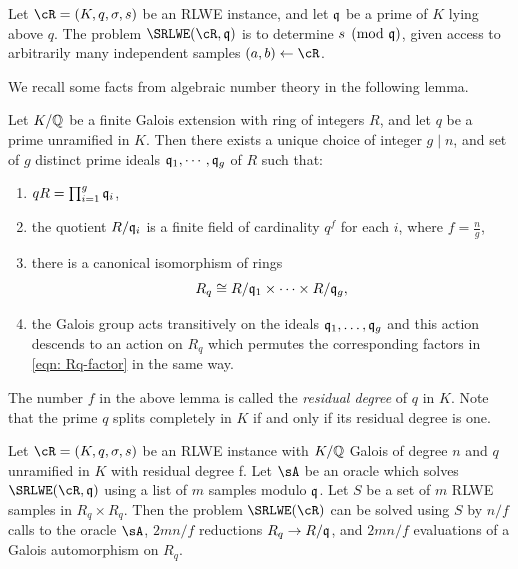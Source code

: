 \documentclass{amsart}
\begin{document}

\begin{Definition} \label{def: srlwe mod q}
        Let $\cR = (K,q,\sigma, s)$ be an RLWE instance, and let $\mathfrak{q}$ be a prime of $K$ lying above $q$.  The problem $\SRLWE(\cR, \fq)$ is to determine $s \pmod {\mathfrak{q}}$, given access to arbitrarily many independent samples $(a,b) \gets \cR$.
\end{Definition}

We recall some facts from algebraic number theory in the following lemma.
\begin{Lemma}
\label{lem: prime factorization}
Let $K/\mathbb{Q}$ be a finite Galois extension with ring of integers $R$,  and let $q$ be a prime unramified in $K$. Then there exists a unique choice of integer $g \mid n$, and set of $g$ distinct prime ideals $\mathfrak{q}_1, \cdots ,\mathfrak{q}_g$ of
$R$ such that:
\begin{enumerate}
        \item $qR = \prod_{i=1}^g \mathfrak{q}_i$,
        \item the quotient $R/\mathfrak{q}_{i}$ is a finite field of cardinality $q^f$  for each $i$, where $f = \frac{n}{g}$, 
        \item there is a canonical isomorphism of rings
                \begin{equation}
                        \label{eqn: Rq-factor}
    R_q \cong R/\mathfrak{q}_{1} \times \cdots \times R/\mathfrak{q}_{g},
    \end{equation}
\item the Galois group acts transitively on the ideals $\mathfrak{q}_1, \ldots, \mathfrak{q}_g$ and this action descends to an action on $R_q$ which permutes the corresponding factors in \eqref{eqn: Rq-factor} in the same way.
\end{enumerate}
\end{Lemma}
The number $f$ in the above lemma is called the {\it residual degree} of $q$ in $K$. Note that the prime $q$ splits completely in $K$ if and only if its residual degree is one.


\begin{theorem} \label{thm: reduction}
        Let $\cR = (K,q,\sigma, s)$ be an RLWE instance with $K/\mathbb{Q}$ Galois of degree $n$ and $q$ unramified in $K$ with residual degree f. Let $\sA$ be an oracle which solves $\SRLWE(\cR,\fq)$ using a list of $m$ samples modulo $\mathfrak{q}$.  Let $S$ be a set of $m$ RLWE samples in $R_q \times R_q$.  Then the problem $\SRLWE(\cR)$ can be solved using $S$ by $n/f$ calls to the oracle $\sA$, $2mn/f$ reductions $R_q \rightarrow R/\mathfrak{q}$, and $2mn/f$ evaluations of a Galois automorphism on $R_q$.
\end{theorem}
\end{document}
